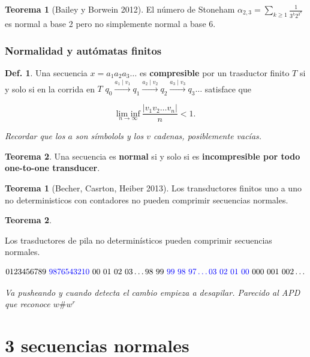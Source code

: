 \documentclass{report}
\theoremstyle{definition} %
\newtheorem{theorem}{Teorema}
\newtheorem*{theorem*}{Teorema}
\newtheorem{definition}{Def.}
\begin{document}
\begin{theorem}[Bailey y Borwein 2012]
    El número de Stoneham $\alpha_{2, 3} = \sum_{k \geq 1} \frac{1}{3^k
    2^{3^k}}$ es normal a base 2 pero no simplemente normal a base 6.
\end{theorem}

\subsection{Normalidad y autómatas finitos}

\begin{definition}
    Una secuencia $x = a_1 a_2 a_3 \dots$ es \textbf{compresible} por un
    trasductor finito $T$ si y solo si en la corrida en $T$ $q_0
    \xrightarrow{a_1\mid v_1} q_1 \xrightarrow{a_2\mid v_2} q_2
    \xrightarrow{a_3\mid v_3} q_3 \dots$ satisface que

    $$\underset{n \to \infty}{\text{lim inf}}\ \frac{|v_1 v_2 \dots v_n|}{n} <
    1.$$
    
    \textit{Recordar que los $a$ son símbolols y los $v$ cadenas, posiblemente vacías.}
\end{definition}

\begin{theorem}
    Una secuencia es \textbf{normal} si y solo si es \textbf{incompresible por
    todo one-to-one transducer}.
\end{theorem}

\begin{theorem*}[Becher, Casrton, Heiber 2013]
    Los transductores finitos uno a uno no deterministicos con contadores no
    pueden comprimir secuencias normales.
\end{theorem*}

\begin{theorem*}
    
\end{theorem*}
    Los trasductores de pila no determinísticos pueden comprimir secuencias
    normales.
    
    $$
        0123456789\ \textcolor{blue}{9876543210}\
        00\ 01\ 02\ 03 \dots 98\ 99\ \textcolor{blue}{99\ 98\ 97 \dots 03\ 02\ 01\ 00\ }
        000\ 001\ 002 \dots
    $$

    \textit{Va pusheando y cuando detecta el cambio empieza a desapilar.
    Parecido al APD que reconoce $w\#w^r$}

\chapter{3 secuencias normales}
\end{document}

